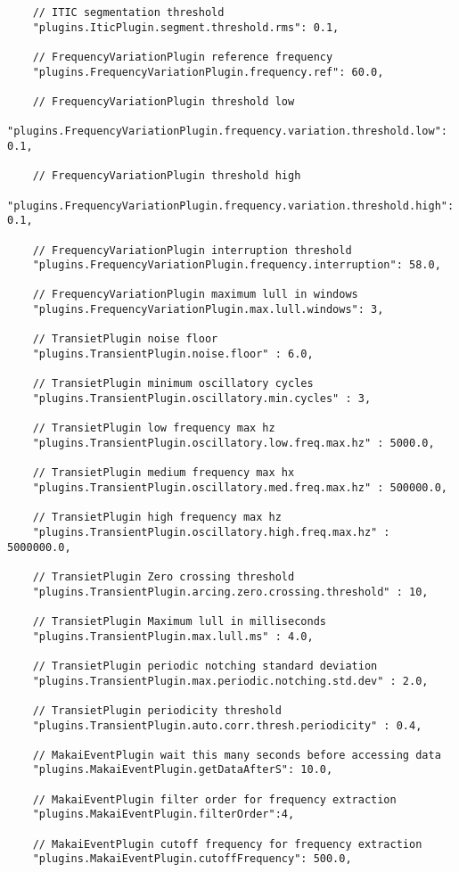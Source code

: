 \begin{verbatim}
	// ITIC segmentation threshold
	"plugins.IticPlugin.segment.threshold.rms": 0.1,

	// FrequencyVariationPlugin reference frequency
	"plugins.FrequencyVariationPlugin.frequency.ref": 60.0,

	// FrequencyVariationPlugin threshold low
	"plugins.FrequencyVariationPlugin.frequency.variation.threshold.low": 0.1,

	// FrequencyVariationPlugin threshold high
	"plugins.FrequencyVariationPlugin.frequency.variation.threshold.high": 0.1,

	// FrequencyVariationPlugin interruption threshold
	"plugins.FrequencyVariationPlugin.frequency.interruption": 58.0,

	// FrequencyVariationPlugin maximum lull in windows
	"plugins.FrequencyVariationPlugin.max.lull.windows": 3,

	// TransietPlugin noise floor
	"plugins.TransientPlugin.noise.floor" : 6.0,

	// TransietPlugin minimum oscillatory cycles
	"plugins.TransientPlugin.oscillatory.min.cycles" : 3,

	// TransietPlugin low frequency max hz
	"plugins.TransientPlugin.oscillatory.low.freq.max.hz" : 5000.0,

	// TransietPlugin medium frequency max hx
	"plugins.TransientPlugin.oscillatory.med.freq.max.hz" : 500000.0,

	// TransietPlugin high frequency max hz
	"plugins.TransientPlugin.oscillatory.high.freq.max.hz" : 5000000.0,

	// TransietPlugin Zero crossing threshold
	"plugins.TransientPlugin.arcing.zero.crossing.threshold" : 10,

	// TransietPlugin Maximum lull in milliseconds
	"plugins.TransientPlugin.max.lull.ms" : 4.0,

	// TransietPlugin periodic notching standard deviation
	"plugins.TransientPlugin.max.periodic.notching.std.dev" : 2.0,

	// TransietPlugin periodicity threshold
	"plugins.TransientPlugin.auto.corr.thresh.periodicity" : 0.4,

	// MakaiEventPlugin wait this many seconds before accessing data
	"plugins.MakaiEventPlugin.getDataAfterS": 10.0,

	// MakaiEventPlugin filter order for frequency extraction
	"plugins.MakaiEventPlugin.filterOrder":4,

	// MakaiEventPlugin cutoff frequency for frequency extraction
	"plugins.MakaiEventPlugin.cutoffFrequency": 500.0,


\end{verbatim}
